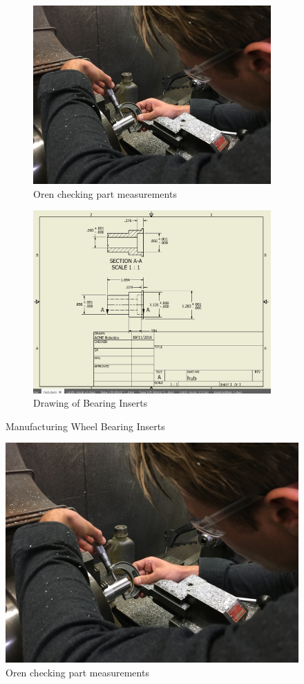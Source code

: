 \documentclass{article}
\begin{document}
\begin{figure}[h!]
\centering
\begin{subfigure}{.45\textwidth}
  \centering
  \includegraphics[width=\textwidth]{08_10-22/images/IMG_0330.JPG}
  \caption{Oren checking part measurements}
  \label{fig:Turning Insets}
 \end{subfigure}
\begin{subfigure}{.45\textwidth}
  \centering
  \includegraphics[width=\textwidth]{08_10-22/images/Screen.png}
  \caption{Drawing of Bearing Inserts}
  \label{fig:Hub}
  \end{subfigure}
  \caption{Manufacturing Wheel Bearing Inserts}
  \end{figure}

\begin{figure}
    \centering
    \includegraphics[width=.6 \textwidth]{08_10-22/images/IMG_0330.JPG}
    \caption{Oren checking part measurements}
    \label{fig: Turning Inserts}
\end{figure}
\end{document}
